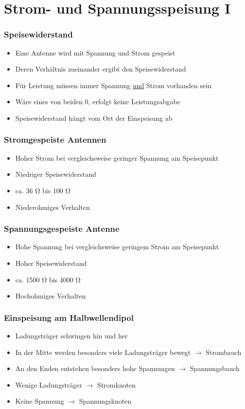 
\section{Strom- und Spannungsspeisung I}
\label{section:strom_spannung_speisung_1}
\begin{frame}%

\frametitle{Speisewiderstand}
\begin{itemize}
  \item Eine Antenne wird mit Spannung und Strom gespeist
  \item Deren Verhältnis zueinander ergibt den Speisewiderstand
  \item Für Leistung müssen immer Spannung \underline{und} Strom vorhanden sein
  \item Wäre eines von beiden 0, erfolgt keine Leistungsabgabe
  \item Speisewiderstand hängt vom Ort der Einspeisung ab
  \end{itemize}

\end{frame}

\begin{frame}
\frametitle{Stromgespeiste Antennen}
\begin{itemize}
  \item Hoher Strom bei vergleichsweise geringer Spannung am Speisepunkt
  \item Niedriger Speisewiderstand
  \item ca. 36 Ω bis 100 Ω
  \item Niederohmiges Verhalten
  \end{itemize}
\end{frame}

\begin{frame}
\frametitle{Spannungsgespeiste Antenne}
\begin{itemize}
  \item Hohe Spannung bei vergleichsweise geringem Strom am Speisepunkt
  \item Hoher Speisewiderstand
  \item ca. 1500 Ω bis 4000 Ω
  \item Hochohmiges Verhalten
  \end{itemize}
\end{frame}

\begin{frame}
\frametitle{Einspeisung am Halbwellendipol}
\begin{itemize}
  \item Ladungsträger schwingen hin und her
  \item In der Mitte werden besonders viele Ladungsträger bewegt $\rightarrow$ Strombauch
  \item An den Enden entstehen besonders hohe Spannungen $\rightarrow$ Spannungsbauch
  \item Wenige Ladungsträger $\rightarrow$ Stromknoten
  \item Keine Spannung $\rightarrow$ Spannungsknoten
  \end{itemize}

\end{frame}


